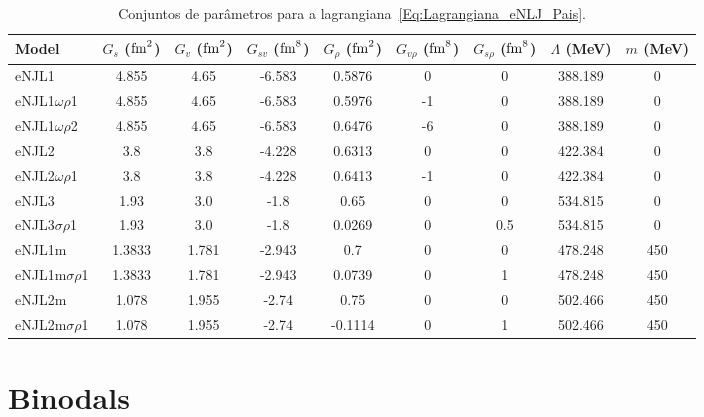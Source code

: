 \documentclass[prc, reprint, amsmath, floatfix, linenumbers,10pt]{revtex4-1}
\begin{document}
\begin{table*}
\caption{Conjuntos de parâmetros para a lagrangiana~\eqref{Eq:Lagrangiana_eNLJ_Pais}\cite{Pais2016}. \label{Tab:Parametros_eNJL}}
\begin{ruledtabular}
\begin{tabular}{lcccccccc}
Model & $G_s$ ($\rm{fm}^2$) & $G_v$ ($\rm{fm}^2$) & $G_{sv}$ ($\rm{fm}^8$) & $G_\rho$ ($\rm{fm}^2$) & $G_{v\rho}$ ($\rm{fm}^8$) & $G_{s\rho}$ ($\rm{fm}^8$) & $\Lambda$ (MeV) & $m$ (MeV) \\
\hline
eNJL1 & 4.855 & 4.65 & -6.583 & 0.5876 & 0 & 0 & 388.189 & 0 \\
eNJL1$\omega\rho$1 & 4.855 & 4.65 & -6.583 & 0.5976 & -1 & 0 & 388.189 & 0 \\
eNJL1$\omega\rho$2 & 4.855 & 4.65 & -6.583 & 0.6476 & -6 & 0 & 388.189 & 0 \\
eNJL2 & 3.8 & 3.8 & -4.228 & 0.6313 & 0 & 0 & 422.384 & 0 \\
eNJL2$\omega\rho$1 & 3.8 & 3.8 & -4.228 & 0.6413 & -1 & 0 & 422.384 & 0 \\
eNJL3 & 1.93 & 3.0 & -1.8 & 0.65 & 0 & 0 & 534.815 & 0 \\
eNJL3$\sigma\rho$1 & 1.93 & 3.0 & -1.8 & 0.0269 & 0 & 0.5 & 534.815 & 0 \\
eNJL1m & 1.3833 & 1.781 & -2.943 & 0.7 & 0 & 0 & 478.248 & 450 \\
eNJL1m$\sigma\rho$1 & 1.3833 & 1.781 & -2.943 & 0.0739 & 0 & 1 & 478.248 & 450 \\
eNJL2m & 1.078 & 1.955 & -2.74 & 0.75 & 0 & 0 & 502.466 & 450 \\
eNJL2m$\sigma\rho$1 & 1.078 & 1.955 & -2.74 & -0.1114 & 0 & 1 & 502.466 & 450 \\
\end{tabular}
\end{ruledtabular}
\end{table*}

\section{Binodals}
\end{document}

